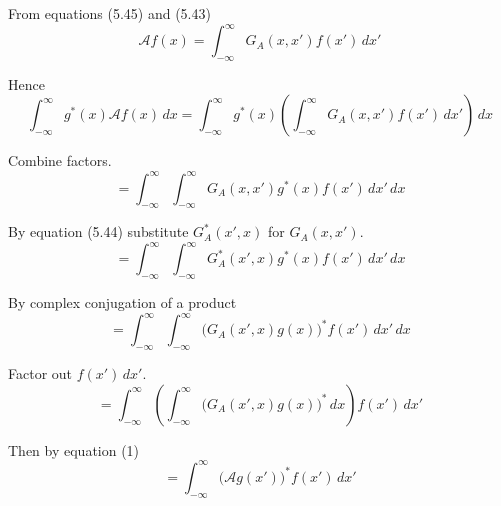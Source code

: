 


From equations (5.45) and (5.43)
\begin{equation*}
\mathcal Af(x)=\int_{-\infty}^\infty G_A(x,x')f(x')\,dx'
\tag{1}
\end{equation*}

Hence
\begin{equation*}
\int_{-\infty}^\infty g^*(x)\mathcal Af(x)\,dx
=\int_{-\infty}^\infty g^*(x)
\left(\int_{-\infty}^\infty G_A(x,x')f(x')\,dx'\right)
\,dx
\end{equation*}

Combine factors.
\begin{equation*}
{}=\int_{-\infty}^\infty
\int_{-\infty}^\infty G_A(x,x')g^*(x)f(x')\,dx'
\,dx
\end{equation*}

By equation (5.44) substitute $G_A^*(x',x)$ for $G_A(x,x')$.
\begin{equation*}
{}=\int_{-\infty}^\infty
\int_{-\infty}^\infty G_A^*(x',x)g^*(x)f(x')\,dx'
\,dx
\end{equation*}

By complex conjugation of a product
\begin{equation*}
{}=\int_{-\infty}^\infty
\int_{-\infty}^\infty\big(G_A(x',x)g(x)\big)^*f(x')\,dx'
\,dx
\end{equation*}

Factor out $f(x')\,dx'$.
\begin{equation*}
{}=\int_{-\infty}^\infty
\left(\int_{-\infty}^\infty\big(G_A(x',x)g(x)\big)^*\,dx\right)f(x')\,dx'
\end{equation*}

Then by equation (1)
\begin{equation*}
{}=\int_{-\infty}^\infty\big(\mathcal Ag(x')\big)^*f(x')\,dx'
\end{equation*}


